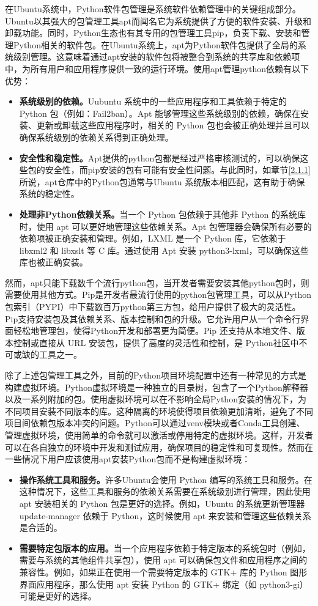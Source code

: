 在Ubuntu系统中，Python软件包管理是系统软件依赖管理中的关键组成部分。Ubuntu以其强大的包管理工具apt而闻名它为系统提供了方便的软件安装、升级和卸载功能。同时，Python生态也有其专用的包管理工具pip，负责下载、安装和管理Python相关的软件包。在Ubuntu系统上，apt为Python软件包提供了全局的系统级别管理。这意味着通过apt安装的软件包将被整合到系统的共享库和依赖项中，为所有用户和应用程序提供一致的运行环境。使用apt管理python依赖有以下优势：
\begin{itemize}
	\item \textbf{系统级别的依赖。}Uubuntu 系统中的一些应用程序和工具依赖于特定的 Python 包（例如：Fail2ban）。Apt 能够管理这些系统级别的依赖，确保在安装、更新或卸载这些应用程序时，相关的 Python 包也会被正确处理并且可以确保系统级别的依赖关系得到正确处理。
	\item \textbf{安全性和稳定性。}Apt提供的python包都是经过严格审核测试的，可以确保这些包的安全性，而pip安装的包有可能有安全性问题。与此同时，如章节\ref{2.1.1}所说，apt仓库中的Python包通常与Ubuntu 系统版本相匹配，这有助于确保系统的稳定性。
	\item \textbf{处理非Python依赖关系。}当一个 Python 包依赖于其他非 Python 的系统库时，使用 apt 可以更好地管理这些依赖关系。Apt 包管理器会确保所有必要的依赖项被正确安装和管理。例如，LXML 是一个 Python 库，它依赖于 libxml2 和 libxslt 等 C 库。通过使用 Apt 安装 python3-lxml，可以确保这些库也被正确安装。
\end{itemize}

然而，apt只能下载数千个流行python包，当开发者需要安装其他python包时，则需要使用其他方式。Pip是开发者最流行使用的python包管理工具，可以从Python包索引（PYPI）中下载数百万python第三方包，给用户提供了极大的灵活性。Pip支持安装包及其依赖关系、版本控制和包的升级。它允许用户从一个命令行界面轻松地管理包，使得Python开发和部署更为简便。Pip 还支持从本地文件、版本控制或直接从 URL 安装包，提供了高度的灵活性和控制，是 Python社区中不可或缺的工具之一。

除了上述包管理工具之外，目前的Python项目环境配置中还有一种常见的方式是构建虚拟环境。Python虚拟环境是一种独立的目录树，包含了一个Python解释器以及一系列附加的包。使用虚拟环境可以在不影响全局Python安装的情况下，为不同项目安装不同版本的库。这种隔离的环境使得项目依赖更加清晰，避免了不同项目间依赖包版本冲突的问题。Python可以通过venv模块或者Conda工具创建、管理虚拟环境，使用简单的命令就可以激活或停用特定的虚拟环境。这样，开发者可以在各自独立的环境中开发和测试应用，确保项目的稳定性和可复现性。然而在一些情况下用户应该使用apt安装Python包而不是构建虚拟环境：
\begin{itemize}
	\item \textbf{操作系统工具和服务。}许多Ubuntu会使用 Python 编写的系统工具和服务。在这种情况下，这些工具和服务的依赖关系需要在系统级别进行管理，因此使用 apt 安装相关的 Python 包是更好的选择。例如，Ubuntu 的系统更新管理器 update-manager 依赖于 Python，这时候使用 apt 来安装和管理这些依赖关系是合适的。
	\item \textbf{需要特定包版本的应用。}当一个应用程序依赖于特定版本的系统包时（例如，需要与系统的其他组件共享包），使用 apt 可以确保包文件和应用程序之间的兼容性。例如，如果正在使用一个需要特定版本的 GTK+ 库的 Python 图形界面应用程序，那么使用 apt 安装 Python 的 GTK+ 绑定（如 python3-gi）可能是更好的选择。
\end{itemize}

